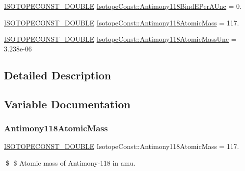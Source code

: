 \begin{DoxyCompactItemize}
\mbox{\hyperlink{group___isotope_const-_macros_ga8f45a7272ce02c0b4c65c44636ed719a}{I\+S\+O\+T\+O\+P\+E\+C\+O\+N\+S\+T\+\_\+\+D\+O\+U\+B\+LE}} \mbox{\hyperlink{group___isotope_const-_antimony-_sb118_gadbbeba97e337d0e57ae90719e9f9a81e}{Isotope\+Const\+::\+Antimony118\+Bind\+E\+Per\+A\+Unc}} = 0.
\item 
\mbox{\hyperlink{group___isotope_const-_macros_ga8f45a7272ce02c0b4c65c44636ed719a}{I\+S\+O\+T\+O\+P\+E\+C\+O\+N\+S\+T\+\_\+\+D\+O\+U\+B\+LE}} \mbox{\hyperlink{group___isotope_const-_antimony-_sb118_ga9062450c9195f3b72f3a7b98958606d4}{Isotope\+Const\+::\+Antimony118\+Atomic\+Mass}} = 117.
\item 
\mbox{\hyperlink{group___isotope_const-_macros_ga8f45a7272ce02c0b4c65c44636ed719a}{I\+S\+O\+T\+O\+P\+E\+C\+O\+N\+S\+T\+\_\+\+D\+O\+U\+B\+LE}} \mbox{\hyperlink{group___isotope_const-_antimony-_sb118_ga38b12fbf35c1552a93dff2e8c3751f6a}{Isotope\+Const\+::\+Antimony118\+Atomic\+Mass\+Unc}} = 3.\+238e-\/06
\end{DoxyCompactItemize}


\subsection{Detailed Description}


\subsection{Variable Documentation}
\mbox{\label{group___isotope_const-_antimony-_sb118_ga9062450c9195f3b72f3a7b98958606d4}} 
\subsubsection{\texorpdfstring{Antimony118\+Atomic\+Mass}{Antimony118AtomicMass}}
{\footnotesize\ttfamily \mbox{\hyperlink{group___isotope_const-_macros_ga8f45a7272ce02c0b4c65c44636ed719a}{I\+S\+O\+T\+O\+P\+E\+C\+O\+N\+S\+T\+\_\+\+D\+O\+U\+B\+LE}} Isotope\+Const\+::\+Antimony118\+Atomic\+Mass = 117.}

\$ \$ Atomic mass of Antimony-\/118 in amu. \mbox{\label{group___isotope_const-_antimony-_sb118_ga38b12fbf35c1552a93dff2e8c3751f6a}} 
